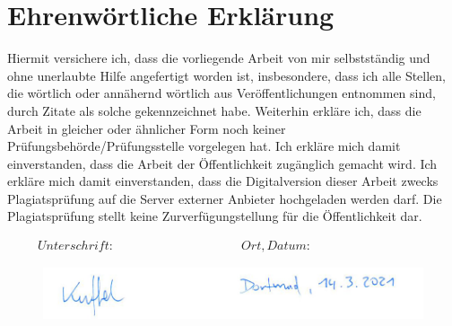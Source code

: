 \section*{Ehrenwörtliche Erklärung}
\thispagestyle{empty}

Hiermit versichere ich, dass die vorliegende Arbeit von mir selbstständig und ohne unerlaubte Hilfe angefertigt worden ist, insbesondere, dass ich alle Stellen, die wörtlich oder
annähernd wörtlich aus Veröffentlichungen entnommen sind, durch Zitate als solche gekennzeichnet habe.
Weiterhin erkläre ich, dass die Arbeit in gleicher oder ähnlicher Form noch keiner Prüfungsbehörde/Prüfungsstelle vorgelegen hat.
Ich erkläre mich damit einverstanden, dass die Arbeit der Öffentlichkeit zugänglich gemacht wird.
Ich erkläre mich  damit einverstanden, dass die Digitalversion dieser Arbeit zwecks Plagiatsprüfung auf die Server externer Anbieter hochgeladen werden darf.
Die Plagiatsprüfung stellt keine Zurverfügungstellung für die Öffentlichkeit dar.

\begin{displaymath}
\begin{array}{ll}
Unterschrift:~~~~~~~~~~~~~~~~~~~~~~~~~~~~~~~~~~~~~~~~~~
& Ort, Datum:~~~~~~~~~~~~~~~~~~~~~~~~~~~~~~~~~~~~~~~~~~
\end{array}
\end{displaymath}

\begin{figure}[htb]
    \centering
    \includegraphics[width=1.0\textwidth]{images/unterschrift.jpg}
\end{figure}